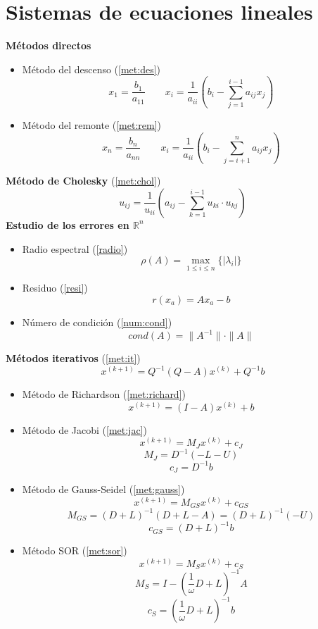 \section*{Sistemas de ecuaciones lineales}
\noindent\textbf{Métodos directos}
\begin{itemize}
    \item Método del descenso (\ref{met:des})
    $$x_1=\dfrac{b_1}{a_{11}}\qquad x_i=
\dfrac{1}{a_{ii}}(b_i-\sum_{j=1}^{i-1}a_{ij}x_j)$$
\item  Método del remonte (\ref{met:rem})
$$x_n=\dfrac{b_n}{a_{nn}}  \qquad x_i=\dfrac{1}{a_{ii}}(b_i-\sum_{j=i+1}^{n}a_{ij}x_j)$$
\end{itemize}
\textbf{Método de Cholesky} (\ref{met:chol})
$$u_{ij}=\dfrac{1}{u_{ii}}\left(a_{ij}-\sum_{k=1}^{i-1}u_{ki}\cdot u_{kj}\right) $$
\textbf{Estudio de los errores en $\mathbb{R}^n$}
\begin{itemize}
    \item Radio espectral (\ref{radio})
    $$\rho(A)=\max_{1 \leq i \leq n}\{|\lambda_i|\}$$
    \item Residuo (\ref{resi})
$$r(x_a)=Ax_a-b$$
    \item Número de condición (\ref{num:cond})
    $$cond(A)=\|A^{-1}\|\cdot \|A\|$$
\end{itemize}
\textbf{Métodos iterativos} (\ref{met:it})
$$x^{(k+1)}=Q^{-1}(Q-A)x^{(k)}+Q^{-1}b$$
\begin{itemize}
    \item Método de Richardson (\ref{met:richard})
    $$x^{(k+1)}=(I-A)x^{(k)}+b$$
    \item Método de Jacobi (\ref{met:jac})
    $$x^{(k+1)}=M_J x^{(k)}+c_J $$
    $$M_J=D^{-1}(-L-U)$$
$$c_J=D^{-1}b$$
    \item Método de Gauss-Seidel (\ref{met:gauss})
     $$x^{(k+1)}=M_{GS} x^{(k)} + c_{GS}$$
     $$M_{GS}=(D+L)^{-1}(D+L-A)=(D+L)^{-1}(-U)$$
    $$c_{GS}=(D+L)^{-1} b$$
    \item Método SOR (\ref{met:sor})
    $$x^{(k+1)}=M_{S}x^{(k)} +c_S$$
    $$M_S=I-\left(\frac{1}{\omega} D + L\right)^{-1}A$$
    $$c_S=\left(\frac{1}{\omega} D + L\right)^{-1} b$$
    
\end{itemize}
